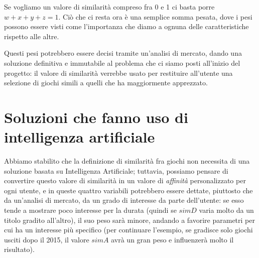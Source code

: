             Se vogliamo un valore di similarità compreso fra 0 e 1 ci basta porre $w + x + y + z = 1$. Ciò che ci resta ora è una semplice somma pesata, dove i pesi possono essere visti come l'importanza che diamo a ognuna delle caratteristiche rispetto alle altre.
            
            Questi pesi potrebbero essere decisi tramite un'analisi di mercato, dando una soluzione definitiva e immutabile al problema che ci siamo posti all'inizio del progetto: il valore di similarità verrebbe usato per restituire all'utente una selezione di giochi simili a quelli che ha maggiormente apprezzato.
            
    \section{Soluzioni che fanno uso di intelligenza artificiale}
        Abbiamo stabilito che la definizione di similarità fra giochi non necessita di una soluzione basata su Intelligenza Artificiale; tuttavia, possiamo pensare di convertire questo valore di similarità in un valore di \textit{affinità} personalizzato per ogni utente, e in queste quattro variabili potrebbero essere dettate, piuttosto che da un'analisi di mercato, da un grado di interesse da parte dell'utente: se esso tende a mostrare poco interesse per la durata (quindi se $simD$ varia molto da un titolo gradito all'altro), il suo peso sarà minore, andando a favorire parametri per cui ha un interesse più specifico (per continuare l'esempio, se gradisce solo giochi usciti dopo il 2015, il valore $simA$ avrà un gran peso e influenzerà molto il risultato).